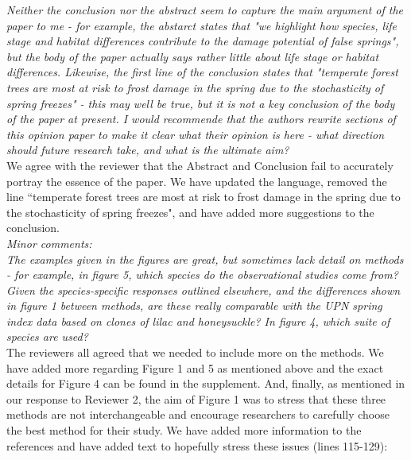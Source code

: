 \documentclass[11pt,a4paper]{article}
\begin{document}
\textit{Neither the conclusion nor the abstract seem to capture the main argument of the paper to me - for example, the abstarct states that "we highlight how species, life stage and habitat differences contribute to the damage potential of false springs", but the body of the paper actually says rather little about life stage or habitat differences.  Likewise, the first line of the conclusion states that "temperate forest trees are most at risk to frost damage in the spring due to the stochasticity of spring freezes" - this may well be true, but it is not a key conclusion of the body of the paper at present. I would recommende that the authors rewrite sections of this opinion paper to make it clear what their opinion is here - what direction should future research take, and what is the ultimate aim?} \\

We agree with the reviewer that the Abstract and Conclusion fail to accurately portray the essence of the paper. We have updated the language, removed the line ``temperate forest trees are most at risk to frost damage in the spring due to the stochasticity of spring freezes", and have added more suggestions to the conclusion. \\ %


\textit{Minor comments: \\
The examples given in the figures are great, but sometimes lack detail on methods - for example, in figure 5, which species do the observational studies come from?  Given the species-specific responses outlined elsewhere, and the differences shown in figure 1 between methods, are these really comparable with the UPN spring index data based on clones of lilac and honeysuckle?
In figure 4, which suite of species are used?} \\

The reviewers all agreed that we needed to include more on the methods. We have added more regarding Figure 1 and 5 as mentioned above and the exact details for Figure 4 can be found in the supplement. And, finally, as mentioned in our response to Reviewer 2, the aim of Figure 1 was to stress that these three methods are not interchangeable and encourage researchers to carefully choose the best method for their study. We have added more information to the references and have added text to hopefully stress these issues (lines 115-129): 
\end{document}
